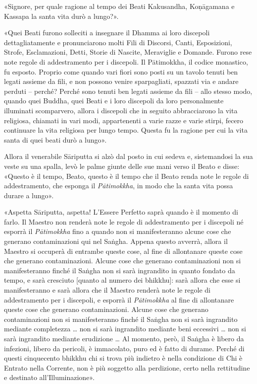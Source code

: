 «Signore, per quale ragione al tempo dei Beati Kakusandha, Koṇāgamana e Kassapa
la santa vita durò a lungo?».

«Quei Beati furono solleciti a insegnare il Dhamma ai loro discepoli
dettagliatamente e pronunciarono molti Fili di Discorsi, Canti, Esposizioni,
Strofe, Esclamazioni, Detti, Storie di Nascite, Meraviglie e Domande. Furono
rese note regole di addestramento per i discepoli. Il Pātimokkha, il codice
monastico, fu esposto. Proprio come quando vari fiori sono posti su un tavolo
tenuti ben legati assieme da fili, e non possono venire sparpagliati, spazzati
via e andare perduti – perché? Perché sono tenuti ben legati assieme da fili –
allo stesso modo, quando quei Buddha, quei Beati e i loro discepoli da loro
personalmente illuminati scomparvero, allora i discepoli che in seguito
abbracciarono la vita religiosa, chiamati in vari modi, appartenenti a varie
razze e varie stirpi, fecero continuare la vita religiosa per lungo tempo.
Questa fu la ragione per cui la vita santa di quei beati durò a lungo».

Allora il venerabile Sāriputta si alzò dal posto in cui sedeva e, sistemandosi
la sua veste su una spalla, levò le palme giunte delle sue mani verso il Beato e
disse: «Questo è il tempo, Beato, questo è il tempo che il Beato renda note le
regole di addestramento, che esponga il \emph{Pātimokkha}, in modo che la santa
vita possa durare a lungo».

«Aspetta Sāriputta, aspetta! L’Essere Perfetto saprà quando è il momento di
farlo. Il Maestro non renderà note le regole di addestramento per i discepoli né
esporrà il \emph{Pātimokkha} fino a quando non si manifesteranno alcune cose che
generano contaminazioni qui nel Saṅgha. Appena questo avverrà, allora il Maestro
si occuperà di entrambe queste cose, al fine di allontanare queste cose che
generano contaminazioni. Alcune cose che generano contaminazioni non si
manifesteranno finché il Saṅgha non si sarà ingrandito in quanto fondato da
tempo, e sarà cresciuto [quanto al numero dei bhikkhu]: sarà allora che esse si
manifesteranno e sarà allora che il Maestro renderà note le regole di
addestramento per i discepoli, e esporrà il \emph{Pātimokkha} al fine di
allontanare queste cose che generano contaminazioni. Alcune cose che generano
contaminazioni non si manifesteranno finché il Saṅgha non si sarà ingrandito
mediante completezza … non si sarà ingrandito mediante beni eccessivi … non si
sarà ingrandito mediante erudizione … Al momento, però, il Saṅgha è libero da
infezioni, libero da pericoli, è immacolato, puro ed è fatto di durame. Perché
di questi cinquecento bhikkhu chi si trova più indietro è nella condizione di
Chi è Entrato nella Corrente, non è più soggetto alla perdizione, certo nella
rettitudine e destinato all’Illuminazione».

